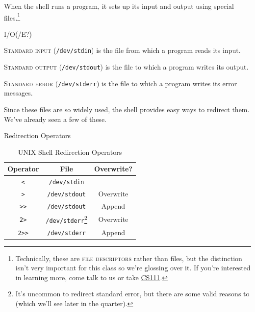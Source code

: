 When the shell runs a program, it sets up its input and output using special
files.\footnote{
  Technically, these are \textsc{file descriptors} rather than files, but the
  distinction isn't very important for this class so we're glossing over it. If
  you're interested in learning more, come talk to us or take
  \href{https://cs111.stanford.edu}{CS111}.
}

\begin{frame}[c]{I/O(/E?)}
  \begin{definition}
    \textsc{Standard input} (\texttt{/dev/stdin}) is the file from which a
    program reads its input.  
  \end{definition}
  \pause
  \begin{definition}
    \textsc{Standard output} (\texttt{/dev/stdout}) is the file to which a
    program writes its output.
  \end{definition}
  \pause
  \begin{definition}
    \textsc{Standard error} (\texttt{/dev/stderr}) is the file to which a
    program writes its error messages.
  \end{definition}
\end{frame}

Since these files are so widely used, the shell provides easy ways to redirect
them.  We've already seen a few of these.

\begin{frame}[c]{Redirection Operators}
  \begin{table}
    \centering
    \begin{tabular}{c|c|c}
      Operator & File & Overwrite? \\
      \hline
      \texttt{<} & \texttt{/dev/stdin} &  \\
      \texttt{>} & \texttt{/dev/stdout} & Overwrite \\
      \texttt{>>} & \texttt{/dev/stdout} & Append \\
      \texttt{2>} & \texttt{/dev/stderr}\footnote{It's uncommon to redirect standard error, but there are some valid reasons to (which we'll see later in the quarter).} & Overwrite \\
      \texttt{2>>} & \texttt{/dev/stderr} & Append \\
    \end{tabular}
    \caption{UNIX Shell Redirection Operators}
    \label{tab:redirection}
  \end{table}
\end{frame}


